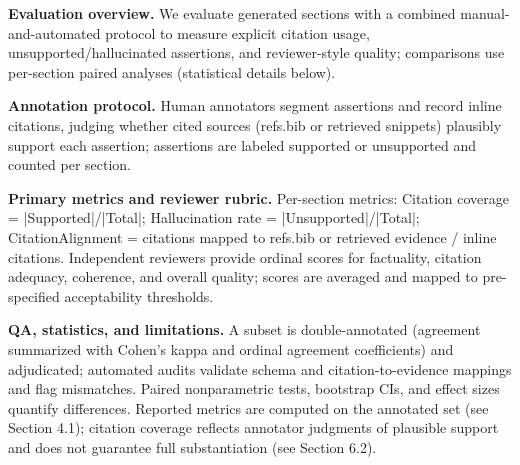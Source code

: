 \textbf{Evaluation overview.} We evaluate generated sections with a combined manual-and-automated protocol to measure explicit citation usage, unsupported/hallucinated assertions, and reviewer-style quality; comparisons use per-section paired analyses (statistical details below).

\textbf{Annotation protocol.} Human annotators segment assertions and record inline citations, judging whether cited sources (refs.bib or retrieved snippets) plausibly support each assertion; assertions are labeled supported or unsupported and counted per section.

\textbf{Primary metrics and reviewer rubric.} Per-section metrics: Citation coverage = |Supported|/|Total|; Hallucination rate = |Unsupported|/|Total|; CitationAlignment = citations mapped to refs.bib or retrieved evidence / inline citations. Independent reviewers provide ordinal scores for factuality, citation adequacy, coherence, and overall quality; scores are averaged and mapped to pre-specified acceptability thresholds.

\textbf{QA, statistics, and limitations.} A subset is double-annotated (agreement summarized with Cohen's kappa and ordinal agreement coefficients) and adjudicated; automated audits validate schema and citation-to-evidence mappings and flag mismatches. Paired nonparametric tests, bootstrap CIs, and effect sizes quantify differences. Reported metrics are computed on the annotated set (see Section 4.1); citation coverage reflects annotator judgments of plausible support and does not guarantee full substantiation (see Section 6.2).